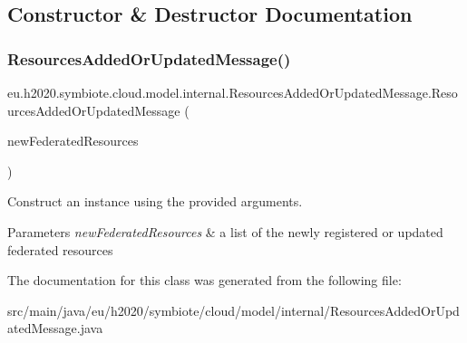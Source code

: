 \subsection{Constructor \& Destructor Documentation}
\mbox{\label{classeu_1_1h2020_1_1symbiote_1_1cloud_1_1model_1_1internal_1_1ResourcesAddedOrUpdatedMessage_a7e8e6484fe05dae2457383048e2ba851}} 
\subsubsection{\texorpdfstring{Resources\+Added\+Or\+Updated\+Message()}{ResourcesAddedOrUpdatedMessage()}}
{\footnotesize\ttfamily eu.\+h2020.\+symbiote.\+cloud.\+model.\+internal.\+Resources\+Added\+Or\+Updated\+Message.\+Resources\+Added\+Or\+Updated\+Message (\begin{DoxyParamCaption}\item[{@Json\+Property(value=\char`\"{}new\+Federated\+Resources\char`\"{}) List$<$ \hyperlink{classeu_1_1h2020_1_1symbiote_1_1cloud_1_1model_1_1internal_1_1FederatedResource}{Federated\+Resource} $>$}]{new\+Federated\+Resources }\end{DoxyParamCaption})}

Construct an instance using the provided arguments.


\begin{DoxyParams}{Parameters}
{\em new\+Federated\+Resources} & a list of the newly registered or updated federated resources \\
\hline
\end{DoxyParams}


The documentation for this class was generated from the following file\+:\begin{DoxyCompactItemize}
\item 
src/main/java/eu/h2020/symbiote/cloud/model/internal/Resources\+Added\+Or\+Updated\+Message.\+java\end{DoxyCompactItemize}
